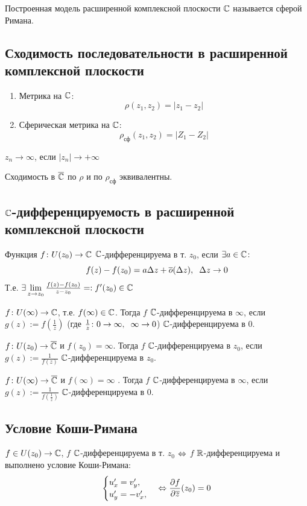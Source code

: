 Построенная модель расширенной комплексной плоскости $\mathbb{C}$ называется сферой Римана.
\subsection{Сходимость последовательности в расширенной комплексной плоскости}
\begin{definition}
  \begin{enumerate}
    \item Метрика на $\mathbb{C}$:
    \[\rho(z_1,z_2) = |z_1-z_2|\]
    \item Сферическая метрика на $\mathbb{C}$:
    \[\rho_{\text{сф}}(z_1,z_2)=|Z_1-Z_2|\]
  \end{enumerate}
\end{definition}
\begin{definition}
  $z_n\to \infty$, если $|z_n|\to+\infty$
\end{definition}
\begin{theorem}
  Сходимость в $\overline{\mathbb{C}}$ по $\rho$ и по $\rho_{\text{сф}}$ эквивалентны.
\end{theorem}
\subsection{$\mathbb{C}$-дифференцируемость в расширенной комплексной плоскости}
\begin{definition}
  Функция $f\colon U(z_0)\to\mathbb{C}$ $\mathbb{C}$-дифференцируема в т. $z_0$, если $\exists a\in\mathbb{C}\colon$
  \[f(z) - f(z_0) = a\Delta z + \overline{o}(\Delta z),\hspace{0.2cm}\Delta z\to 0\]
  Т.е. $\exists \lim\limits_{z \rightarrow z_0}\frac{f(z)-f(z_0)}{z-z_0}=:f'(z_0)\in\mathbb{C}$
\end{definition}
\begin{definition}
  $f\colon U(\infty)\to \mathbb{C}$, т.е. $f(\infty)\in\mathbb{C}$. Тогда $f$ $\mathbb{C}$-дифференцируема в $\infty$, если $g(z):=f(\frac{1}{z})$ (где $\frac{1}{z}\colon 0\to \infty,\hspace{0.2cm} \infty\to 0$) $\mathbb{C}$-дифференцируема в 0.  
\end{definition}
\begin{definition}
  $f\colon U(z_0)\to \overline{\mathbb{C}}$ и $f(z_0)=\infty$. Тогда $f$ $\mathbb{C}$-дифференцируема в $z_0$, если $g(z):=\frac{1}{f(z)}$ $\mathbb{C}$-дифференцируема в $z_0$.  
\end{definition}
\begin{definition}
  $f\colon U(\infty)\to \overline{\mathbb{C}}$ и $f(\infty)=\infty$ . Тогда $f$ $\mathbb{C}$-дифференцируема в $\infty$, если $g(z):=\frac{1}{f(\frac{1}{z})}$  $\mathbb{C}$-дифференцируема в 0.  
\end{definition}
\subsection{Условие Коши-Римана}
\begin{theorem}
  $f\in U(z_0)\to\mathbb{C}$, $f$ $\mathbb{C}$-дифференцируема в т. $z_0$ $\Leftrightarrow$ $f$ $\mathbb{R}$-дифференцируема и выполнено условие Коши-Римана:
  \[ 
  \begin{cases}
    u'_x = v'_y, \\
    u'_y=-v'_x, 
  \end{cases}\Leftrightarrow \frac{\partial f}{\partial \overline{z}}(z_0)=0\]
\end{theorem}
